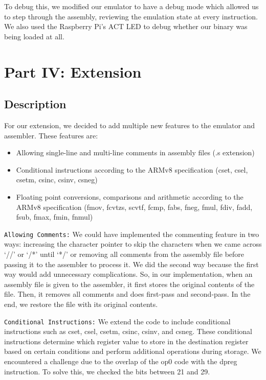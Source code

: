 \documentclass[11pt]{article}
\begin{document}
To debug this, we modified our emulator to have a debug mode which allowed us to step through the assembly, reviewing the emulation state at every instruction. We also used the Raspberry Pi’s ACT LED to debug whether our binary was being loaded at all.


\section{Part IV: Extension}
\subsection{Description}
For our extension, we decided to add multiple new features to the emulator and assembler. These features are:
\begin{itemize}
    \item Allowing single-line and multi-line comments in assembly files (.s extension)
    \item Conditional instructions according to the ARMv8 specification (cset, csel, csetm, csinc, csinv, csneg)
    \item Floating point conversions, comparisons and arithmetic according to the ARMv8 specification (fmov, fcvtzs, scvtf, fcmp, fabs, fneg, fmul, fdiv, fadd, fsub, fmax, fmin, fnmul)
\end{itemize}

\verb|Allowing Comments:| We could have implemented the commenting feature in two ways: increasing the character pointer to skip the characters when we came across ‘//’ or ‘/*’ until ‘*/’ or removing all comments from the assembly file before passing it to the assembler to process it. We did the second way because the first way would add unnecessary complications. So, in our implementation, when an assembly file is given to the assembler, it first stores the original contents of the file. Then, it removes all comments and does first-pass and second-pass. In the end, we restore the file with its original contents.

\verb|Conditional Instructions:| We extend the code to include conditional instructions such as cset, csel, csetm, csinc, csinv, and csneg. These conditional instructions determine which register value to store in the destination register based on certain conditions and perform additional operations during storage. We encountered a challenge due to the overlap of the op0 code with the dpreg instruction. To solve this, we checked the bits between 21 and 29. 
\end{document}
